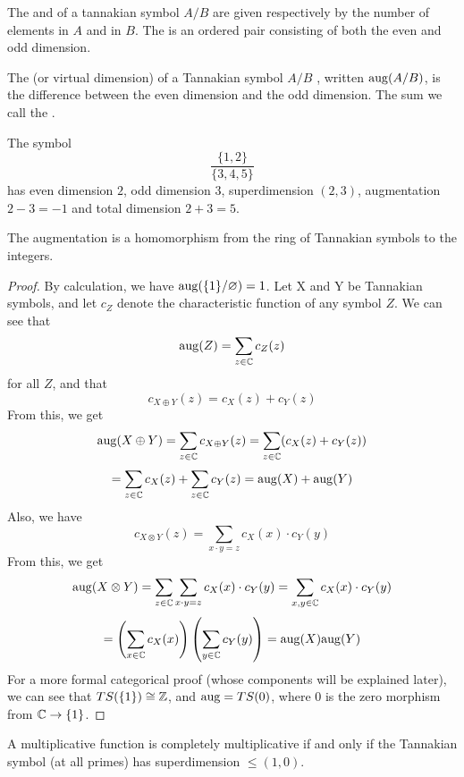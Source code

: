 \begin{definition}
The  and  of a tannakian symbol $A/B$ are given respectively by the number of elements in $A$ and in $B$. The  is an ordered pair consisting of both the even and odd dimension.
\end{definition}%

\begin{definition}
The  (or virtual dimension) of a Tannakian symbol $A/B$ , written $\mathrm{aug}(A/B)$, is the difference between the even dimension and the odd dimension. The sum we call the .
\end{definition}

\begin{example}
The symbol $$\frac{\{1,2\}}{\{3,4,5\}}$$ has even dimension $2$, odd dimension $3$, superdimension $(2, 3)$, augmentation $2 - 3 = -1$ and total dimension $2 + 3 = 5$.
\end{example}

\begin{proposition}
The augmentation is a homomorphism from the ring of Tannakian symbols to the integers.
\end{proposition}

\begin{proof}
By calculation, we have $\mathrm{aug}(\{1\}/\varnothing) = 1$. Let X and Y be Tannakian symbols, and let $c_Z$ denote the characteristic function of any symbol $Z$. We can see that 
$$\mathrm{aug}(Z) = \sum_{z \in \mathbb{C}} c_Z(z)$$
for all $Z$, and that 
$$c_{X \oplus Y}(z) = c_X(z) + c_Y(z)$$
From this, we get
$$\mathrm{aug}(X \oplus Y) = \sum_{z \in \mathbb{C}} c_{X \oplus Y}(z) = \sum_{z \in \mathbb{C}} (c_X(z) + c_Y(z)) $$
$$ = \sum_{z \in \mathbb{C}} c_X(z) + \sum_{z \in \mathbb{C}} c_Y(z) = \mathrm{aug}(X) + \mathrm{aug}(Y)$$
Also, we have 
$$c_{X \otimes Y}(z) = \sum_{x \cdot y=z} c_X(x) \cdot c_Y(y)$$
From this, we get
$$\mathrm{aug}(X \otimes Y) = \sum_{z \in \mathbb{C}} \sum_{x \cdot y=z}c_X(x) \cdot c_Y(y) = \sum_{x, y \in \mathbb{C}} c_X(x) \cdot c_Y(y) $$
$$=\left(\sum_{x \in \mathbb{C}} c_X(x)\right)\left(\sum_{y \in \mathbb{C}} c_Y(y)\right) = \mathrm{aug}(X)\mathrm{aug}(Y)$$
For a more formal categorical proof (whose components will be explained later), we can see that $TS(\{1\}) \cong \mathbb{Z}$, and $\mathrm{aug} = TS(0)$, where $0$ is the zero morphism from $\mathbb{C} \to \{1\}$.
\end{proof}

\begin{proposition}\label{compmultstructure}
A multiplicative function is completely multiplicative if and only if the Tannakian symbol (at all primes) has superdimension $\le (1, 0)$.
\end{proposition}

